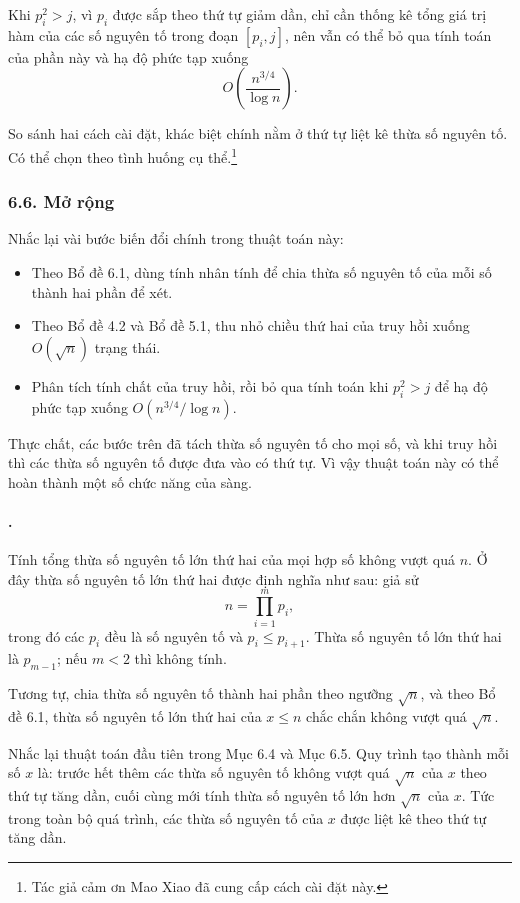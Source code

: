 \documentclass[11pt]{article}
\begin{document}
Khi \(p_i^2>j\), vì \(p_i\) được sắp theo thứ tự giảm dần, chỉ cần thống kê
tổng giá trị hàm của các số nguyên tố trong đoạn \([p_i,j]\), nên vẫn có thể
bỏ qua tính toán của phần này và hạ độ phức tạp xuống
\[
  O\left(\frac{n^{3/4}}{\log n}\right).
\]

So sánh hai cách cài đặt, khác biệt chính nằm ở thứ tự liệt kê thừa số nguyên
tố. Có thể chọn theo tình huống cụ thể.\footnote{Tác giả cảm ơn Mao Xiao đã
cung cấp cách cài đặt này.}

\subsubsection*{6.6. Mở rộng}

Nhắc lại vài bước biến đổi chính trong thuật toán này:
\begin{itemize}
  \item Theo Bổ đề 6.1, dùng tính nhân tính để chia thừa số nguyên tố của mỗi
  số thành hai phần để xét.
  \item Theo Bổ đề 4.2 và Bổ đề 5.1, thu nhỏ chiều thứ hai của truy hồi xuống
  \(O(\sqrt n)\) trạng thái.
  \item Phân tích tính chất của truy hồi, rồi bỏ qua tính toán khi \(p_i^2>j\)
  để hạ độ phức tạp xuống \(O(n^{3/4}/\log n)\).
\end{itemize}

Thực chất, các bước trên đã tách thừa số nguyên tố cho mọi số, và khi truy hồi
thì các thừa số nguyên tố được đưa vào có thứ tự. Vì vậy thuật toán này có thể
hoàn thành một số chức năng của sàng.

\paragraph{.}

Tính tổng thừa số nguyên tố lớn thứ hai của mọi hợp số không vượt quá \(n\).
Ở đây thừa số nguyên tố lớn thứ hai được định nghĩa như sau: giả sử
\[
  n=\prod_{i=1}^{m}p_i,
\]
trong đó các \(p_i\) đều là số nguyên tố và \(p_i\le p_{i+1}\). Thừa số
nguyên tố lớn thứ hai là \(p_{m-1}\); nếu \(m<2\) thì không tính.

Tương tự, chia thừa số nguyên tố thành hai phần theo ngưỡng \(\sqrt n\), và
theo Bổ đề 6.1, thừa số nguyên tố lớn thứ hai của \(x\le n\) chắc chắn không
vượt quá \(\sqrt n\).

Nhắc lại thuật toán đầu tiên trong Mục 6.4 và Mục 6.5. Quy trình tạo thành
mỗi số \(x\) là: trước hết thêm các thừa số nguyên tố không vượt quá
\(\sqrt n\) của \(x\) theo thứ tự tăng dần, cuối cùng mới tính thừa số nguyên
tố lớn hơn \(\sqrt n\) của \(x\). Tức trong toàn bộ quá trình, các thừa số
nguyên tố của \(x\) được liệt kê theo thứ tự tăng dần.
\end{document}

